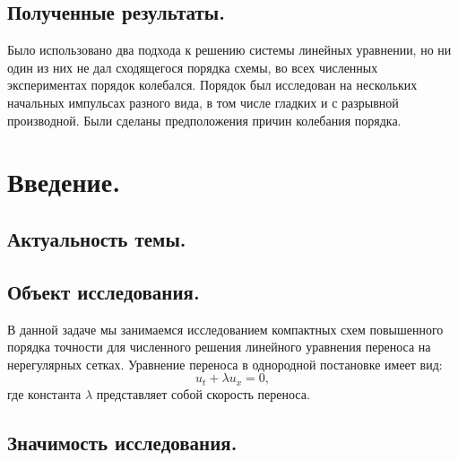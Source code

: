 \documentclass[14pt]{article}
\begin{document}
\subsection*{Полученные результаты.}
Было использовано два подхода к решению системы линейных уравнении, но ни один из них не дал сходящегося порядка схемы, во всех численных экспериментах порядок колебался. Порядок был исследован на нескольких начальных импульсах разного вида, в том числе гладких и с разрывной производной. Были сделаны предположения причин колебания порядка.
\newpage
\tableofcontents



\newpage
\section*{Введение.}
\subsection*{Актуальность темы.}


\subsection*{Объект исследования.}
В данной задаче мы занимаемся исследованием компактных схем повышенного порядка точности для численного решения линейного уравнения переноса на нерегулярных сетках. Уравнение переноса в однородной постановке имеет вид:
\begin{equation}
u_{t} + \lambda u_{x} = 0,
\label{formula1}
\end{equation} 
где константа $\lambda$ представляет собой скорость переноса.


\subsection*{Значимость исследования.}
\end{document}
